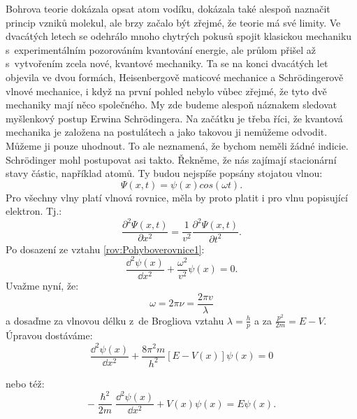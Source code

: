 Bohrova teorie dokázala opsat atom vodíku, dokázala také alespoň naznačit princip vzniků molekul, ale brzy začalo být zřejmé, že teorie má své limity. Ve dvacátých letech se odehrálo mnoho chytrých pokusů spojit klasickou mechaniku s~experimentálním pozorováním kvantování energie, ale průlom přišel až s~vytvořením zcela nové, kvantové mechaniky. Ta se na konci dvacátých let objevila ve dvou formách, Heisenbergově maticové mechanice a Schr\"odingerově vlnové mechanice, i když na první pohled nebylo vůbec zřejmé, že tyto dvě mechaniky mají něco společného. My zde budeme alespoň náznakem sledovat myšlenkový postup Erwina Schr\"odingera. Na začátku je třeba říci, že kvantová mechanika je založena na postulátech a jako takovou ji nemůžeme odvodit. Můžeme ji pouze uhodnout. To ale neznamená, že bychom neměli žádné indicie. 
Schr\"odinger mohl postupovat asi takto. Řekněme, že nás zajímají stacionární stavy částic, například atomů. Ty budou nejspíše popsány stojatou vlnou:
\begin{equation}
\Psi(x,t) = \psi(x)cos(\omega t)\mbox{.}
\label{rov:Pohyboverovnice1}
\end{equation}
Pro všechny vlny platí vlnová rovnice, měla by proto platit i pro vlnu popisující elektron. Tj.:
\begin{equation}
\frac{\partial^2\Psi(x,t)}{\partial x^2} = \frac{1}{v^2}\frac{\partial^2\Psi(x,t)}{\partial t^2}\mbox{.}
\label{rov:Pohyboverovnice2}
\end{equation}
\noindent Po dosazení ze vztahu \ref{rov:Pohyboverovnice1}:
\begin{equation}
\frac{\dd^2\psi(x)}{\dd x^2} + \frac{\omega^2}{v^2}\psi(x) = 0 \mbox{.}
\label{rov:Pohyboverovnice3}
\end{equation}
\noindent Uvažme nyní, že: 
\begin{equation}
\omega = 2\pi\nu = \frac{2\pi v}{\lambda}
\label{rov:Pohyboverovnice4}
\end{equation}
\noindent a dosaďme za vlnovou délku z~de Brogliova vztahu $\lambda = \frac{h}{p}$ a za $\frac{p^2}{2m}=E-V$.
Úpravou dostáváme:
\begin{equation}
\frac{\dd^2\psi(x)}{\dd x^2} + \frac{8\pi^2 m}{h^2}[E - V(x)]\psi(x) = 0 
\label{rov:Pohyboverovnice5}
\end{equation}

\noindent nebo též:
\begin{equation}
-\frac{\hslash^2}{2m}\frac{\dd^2\psi(x)}{\dd x^2} + V(x)\psi(x) = E\psi(x) \mbox{.}
\label{rov:Pohyboverovnice6}
\end{equation}

